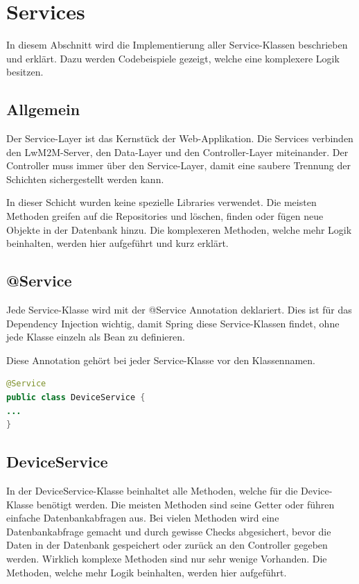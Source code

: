 \newpage

\section{Services}
In diesem Abschnitt wird die Implementierung aller Service-Klassen beschrieben und erklärt. Dazu werden Codebeispiele gezeigt, welche eine komplexere Logik besitzen. 
\subsection{Allgemein}
Der Service-Layer ist das Kernstück der Web-Applikation. Die Services verbinden den LwM2M-Server, den Data-Layer und den Controller-Layer miteinander. Der Controller muss immer über den Service-Layer, damit eine saubere Trennung der Schichten sichergestellt werden kann.

In dieser Schicht wurden keine spezielle Libraries verwendet. Die meisten Methoden greifen auf die Repositories und löschen, finden oder fügen neue Objekte in der Datenbank hinzu. Die komplexeren Methoden, welche mehr Logik beinhalten, werden hier aufgeführt und kurz erklärt. 

\subsection{@Service}
Jede Service-Klasse wird mit der @Service Annotation deklariert. Dies ist für das Dependency Injection wichtig, damit Spring diese Service-Klassen findet, ohne jede Klasse einzeln als Bean zu definieren.

Diese Annotation gehört bei jeder Service-Klasse vor den Klassennamen.
\begin{lstlisting}[language=java]
@Service
public class DeviceService {
...
}
\end{lstlisting}
\newpage

\subsection{DeviceService}
In der DeviceService-Klasse beinhaltet alle Methoden, welche für die Device-Klasse benötigt werden. Die meisten Methoden sind seine Getter oder führen einfache Datenbankabfragen aus. Bei vielen Methoden wird eine Datenbankabfrage gemacht und durch gewisse Checks abgesichert, bevor die Daten in der Datenbank gespeichert oder zurück an den Controller gegeben werden. Wirklich komplexe Methoden sind nur sehr wenige Vorhanden. Die Methoden, welche mehr Logik beinhalten, werden hier aufgeführt.

